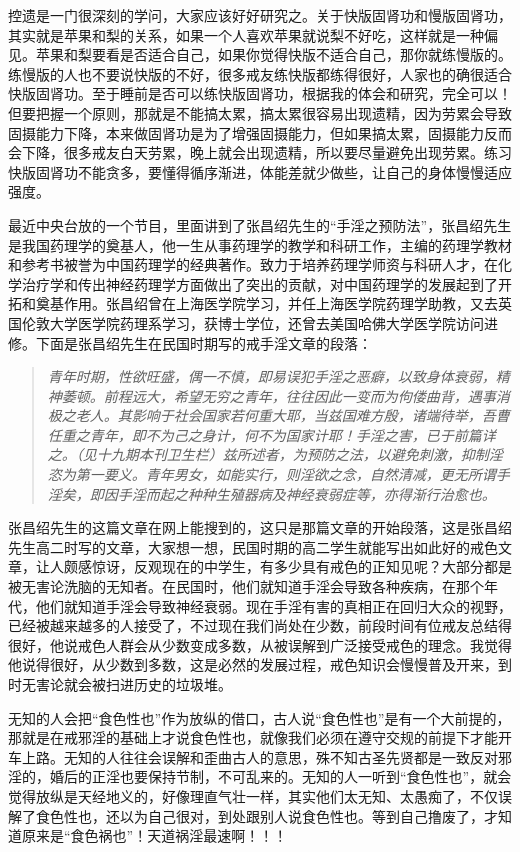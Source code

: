 控遗是一门很深刻的学问，大家应该好好研究之。关于快版固肾功和慢版固肾功，其实就是苹果和梨的关系，如果一个人喜欢苹果就说梨不好吃，这样就是一种偏见。苹果和梨要看是否适合自己，如果你觉得快版不适合自己，那你就练慢版的。练慢版的人也不要说快版的不好，很多戒友练快版都练得很好，人家也的确很适合快版固肾功。至于睡前是否可以练快版固肾功，根据我的体会和研究，完全可以！但要把握一个原则，那就是不能搞太累，搞太累很容易出现遗精，因为劳累会导致固摄能力下降，本来做固肾功是为了增强固摄能力，但如果搞太累，固摄能力反而会下降，很多戒友白天劳累，晚上就会出现遗精，所以要尽量避免出现劳累。练习快版固肾功不能贪多，要懂得循序渐进，体能差就少做些，让自己的身体慢慢适应强度。

最近中央台放的一个节目，里面讲到了张昌绍先生的“手淫之预防法”，张昌绍先生是我国药理学的奠基人，他一生从事药理学的教学和科研工作，主编的药理学教材和参考书被誉为中国药理学的经典著作。致力于培养药理学师资与科研人才，在化学治疗学和传出神经药理学方面做出了突出的贡献，对中国药理学的发展起到了开拓和奠基作用。张昌绍曾在上海医学院学习，并任上海医学院药理学助教，又去英国伦敦大学医学院药理系学习，获博士学位，还曾去美国哈佛大学医学院访问进修。下面是张昌绍先生在民国时期写的戒手淫文章的段落：

\begin{quote}\it
    青年时期，性欲旺盛，偶一不慎，即易误犯手淫之恶癖，以致身体衰弱，精神萎顿。前程远大，希望无穷之青年，往往因此一变而为佝偻曲背，遇事消极之老人。其影响于社会国家若何重大耶，当兹国难方殷，诸端待举，吾曹任重之青年，即不为己之身计，何不为国家计耶！手淫之害，已于前篇详之。（见十九期本刊卫生栏）兹所述者，为预防之法，以避免刺激，抑制淫恣为第一要义。青年男女，如能实行，则淫欲之念，自然清减，更无所谓手淫矣，即因手淫而起之种种生殖器病及神经衰弱症等，亦得渐行治愈也。
\end{quote}

张昌绍先生的这篇文章在网上能搜到的，这只是那篇文章的开始段落，这是张昌绍先生高二时写的文章，大家想一想，民国时期的高二学生就能写出如此好的戒色文章，让人颇感惊讶，反观现在的中学生，有多少具有戒色的正知见呢？大部分都是被无害论洗脑的无知者。在民国时，他们就知道手淫会导致各种疾病，在那个年代，他们就知道手淫会导致神经衰弱。现在手淫有害的真相正在回归大众的视野，已经被越来越多的人接受了，不过现在我们尚处在少数，前段时间有位戒友总结得很好，他说戒色人群会从少数变成多数，从被误解到广泛接受戒色的理念。我觉得他说得很好，从少数到多数，这是必然的发展过程，戒色知识会慢慢普及开来，到时无害论就会被扫进历史的垃圾堆。

无知的人会把“食色性也”作为放纵的借口，古人说“食色性也”是有一个大前提的，那就是在戒邪淫的基础上才说食色性也，就像我们必须在遵守交规的前提下才能开车上路。无知的人往往会误解和歪曲古人的意思，殊不知古圣先贤都是一致反对邪淫的，婚后的正淫也要保持节制，不可乱来的。无知的人一听到“食色性也”，就会觉得放纵是天经地义的，好像理直气壮一样，其实他们太无知、太愚痴了，不仅误解了食色性也，还以为自己很对，到处跟别人说食色性也。等到自己撸废了，才知道原来是“食色祸也”！天道祸淫最速啊！！！

